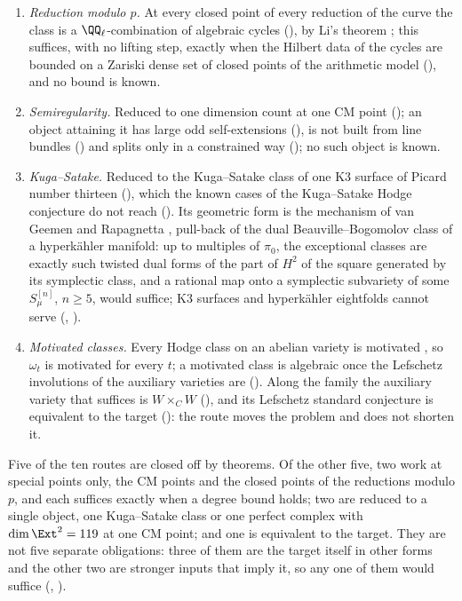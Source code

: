 \begin{remark}
\begin{enumerate}[label=\textup{(\arabic*)},leftmargin=2.6em,itemsep=2pt]
  Rosati-fixed algebra $K_{c}^{+}$, all of it; the Weil structure of the
  fourfold, with which Markman's theorem produces its cycles, reaches $110$
  of the $132$ Hodge classes and none of the exceptional ones
  (, ).
\item \emph{Reduction modulo $p$.} At every closed point of every reduction
  of the curve the class is a $\QQ_{\ell}$-combination of algebraic cycles
  (), by Li's theorem \cite[Theorem~1.1]{Li26}; this
  suffices, with no lifting step, exactly when the Hilbert data of the cycles
  are bounded on a Zariski dense set of closed points of the arithmetic model
  (), and no bound is known.
\item \emph{Semiregularity.} Reduced to one dimension count at one CM point
  (); an object attaining it has large odd
  self-extensions (), is not built from line
  bundles () and splits only in a constrained way
  (); no such object is known.
\item \emph{Kuga--Satake.} Reduced to the Kuga--Satake class of one K3 surface
  of Picard number thirteen (), which the known cases of
  the Kuga--Satake Hodge conjecture do not reach (). Its
  geometric form is the mechanism of van Geemen and Rapagnetta \cite{vGR26},
  pull-back of the dual Beauville--Bogomolov class of a hyperk\"ahler
  manifold: up to multiples of $\pi_{0}$, the exceptional classes are exactly
  such twisted dual forms of the part of $H^{2}$ of the square generated by
  its symplectic class, and a rational map onto a
  symplectic subvariety of some $S_{\mu}^{[n]}$, $n\ge5$, would suffice;
  K3 surfaces and hyperk\"ahler eightfolds cannot serve
  (, ).
\item \emph{Motivated classes.} Every Hodge class on an abelian variety is
  motivated \cite[Th\'eor\`eme~0.6.2]{And96b}, so $\omega_{t}$ is motivated for
  every $t$; a motivated class is algebraic once the Lefschetz involutions of
  the auxiliary varieties are (). Along the family the
  auxiliary variety that suffices is $W\times_{C}W$
  (), and its Lefschetz standard conjecture is
  equivalent to the target (): the route moves the
  problem and does not shorten it.
\end{enumerate}
Five of the ten routes are closed off by theorems. Of the other five, two
work at special points only, the CM points and the closed points of the
reductions modulo $p$, and each suffices exactly when a degree bound holds;
two are reduced to a single object, one Kuga--Satake class or one perfect
complex with $\dim\Ext^{2}=119$ at one CM point; and one is equivalent to the
target. They are not five separate obligations: three of them are the target itself
in other forms and the other two are stronger inputs that imply it, so any
one of them would suffice (, ).
\end{remark}

